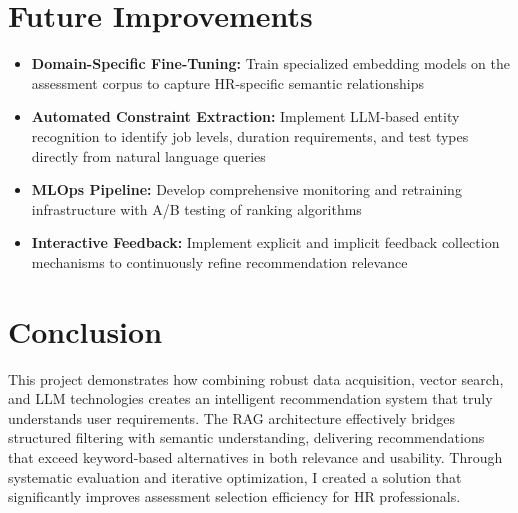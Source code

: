 \documentclass[10pt,a4paper,twocolumn]{article}
\begin{document}
\section{Future Improvements}
\small
\begin{itemize}[leftmargin=*,itemsep=2pt,topsep=0pt,parsep=0pt]
    \item \textbf{Domain-Specific Fine-Tuning:} Train specialized embedding models on the assessment corpus to capture HR-specific semantic relationships
    \item \textbf{Automated Constraint Extraction:} Implement LLM-based entity recognition to identify job levels, duration requirements, and test types directly from natural language queries
    \item \textbf{MLOps Pipeline:} Develop comprehensive monitoring and retraining infrastructure with A/B testing of ranking algorithms
    \item \textbf{Interactive Feedback:} Implement explicit and implicit feedback collection mechanisms to continuously refine recommendation relevance
\end{itemize}

\section*{Conclusion}
\small
This project demonstrates how combining robust data acquisition, vector search, and LLM technologies creates an intelligent recommendation system that truly understands user requirements. The RAG architecture effectively bridges structured filtering with semantic understanding, delivering recommendations that exceed keyword-based alternatives in both relevance and usability. Through systematic evaluation and iterative optimization, I created a solution that significantly improves assessment selection efficiency for HR professionals.
\end{document}
